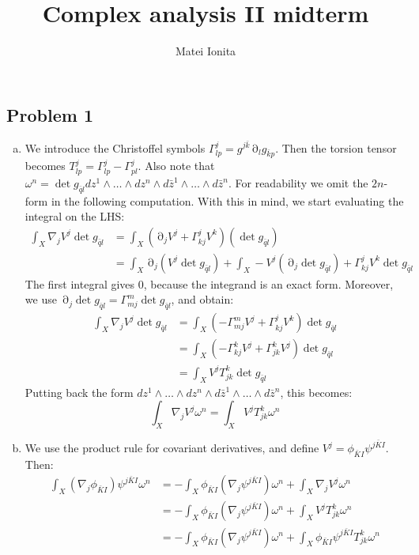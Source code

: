 \documentclass[12 pt]{article}
\title{Complex analysis II midterm}
\author{Matei Ionita}
\DeclareMathOperator {\p} {\partial}
\theoremstyle{plain}
\theoremstyle{definition}
\theoremstyle{remark}
\begin{document}
  \maketitle


\subsection*{Problem 1}
\begin{enumerate}[(a)]
\item We introduce the Christoffel symbols $\Gamma^j_{lp} = g^{j\bar k} \p_l g_{\bar k p}$. Then the torsion tensor becomes 
	$T^{j}_{lp} = \Gamma^j_{lp} - \Gamma^j_{pl}$. Also note that $\omega^n = \det g_{\bar q l} dz^1\wedge \dots \wedge
	dz^n \wedge d \bar z^1 \wedge \dots \wedge d \bar z^n$. For readability we omit the $2n$-form in the following computation.
	With this in mind, we start evaluating the integral on the LHS:
	\begin{align*}
	\int_X \nabla_j V^j \det g_{\bar q l} &= \int_X (\p_j V^j +  \Gamma^j_{kj} V^k ) (\det g_{\bar q l})    \\
	&= \int_X \p_j (V^j \det g_{\bar q l}) + \int_X -V^j (\p_j \det g_{\bar ql}) + \Gamma^j_{kj} V^k \det g_{\bar ql}
	\end{align*}
	The first integral gives 0, because the integrand is an exact form. Moreover, we use $\p_j \det g_{\bar ql} = \Gamma^m_{mj}
	\det g_{\bar ql}$, and obtain:
	\begin{align*}
	\int_X \nabla_j V^j \det g_{\bar q l} &= \int_X(- \Gamma^m_{mj} V^j + \Gamma^j_{kj} V^k ) \det g_{\bar ql} \\
	&= \int_X(- \Gamma^k_{kj} V^j + \Gamma^k_{jk} V^j ) \det g_{\bar ql} \\
	&= \int_X  V^j T^k_{jk} \det g_{\bar q l}
	\end{align*} 
	Putting back the form $dz^1\wedge \dots \wedge dz^n \wedge d \bar z^1 \wedge \dots \wedge d \bar z^n$, this becomes:
	\[    \int_X \nabla_j V^j \omega^n =  \int_X  V^j T^k_{jk} \omega^n   \]
\item We use the product rule for covariant derivatives, and define $V^j = \phi_{\bar K I} \psi^{j\bar K I}$. Then:
	\begin{align*}
	\int_X (\nabla_j \phi_{\bar K I}) \psi^{j \bar K I} \omega^n &= - \int_X \phi_{\bar K I}( \nabla_j \psi^{j\bar K I})
	 \omega^n + \int_X \nabla_j V^j \omega^n \\
	&= - \int_X \phi_{\bar K I}( \nabla_j \psi^{j\bar K I}) \omega^n + \int_X V^j T^k_{jk} \omega^n\\
	&=  - \int_X \phi_{\bar K I}( \nabla_j \psi^{j\bar K I}) \omega^n + \int_X \phi_{\bar K I} \psi^{j\bar K I} T^k_{jk} \omega^n
	\end{align*}
\end{enumerate}
\end{document}
